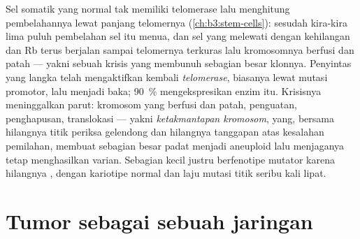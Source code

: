 \begin{definition}\label{def:b3:cancer-biology:telomerase}
Sel somatik yang normal tak memiliki telomerase lalu menghitung pembelahannya
lewat panjang telomernya (\cref{ch:b3:stem-cells}): sesudah kira-kira lima
puluh pembelahan sel itu menua, dan sel yang melewati  dengan
kehilangan  dan Rb terus berjalan sampai telomernya terkuras lalu
kromosomnya berfusi dan patah --- yakni sebuah krisis yang membunuh sebagian
besar klonnya. Penyintas yang langka telah mengaktifkan kembali
\emph{telomerase}, biasanya lewat mutasi promotor, lalu menjadi baka;
\qty{90}{\%}  mengekspresikan enzim itu. Krisisnya meninggalkan parut:
kromosom yang berfusi dan patah, penguatan, penghapusan, translokasi ---
yakni \emph{ketakmantapan kromosom}, yang, bersama hilangnya titik periksa
gelendong dan hilangnya tanggapan  atas kesalahan pemilahan, membuat
sebagian besar  padat menjadi aneuploid lalu menjaganya tetap
menghasilkan varian. Sebagian kecil  justru berfenotipe mutator karena
hilangnya , dengan kariotipe normal dan laju mutasi
titik seribu kali lipat.
\end{definition}

\section{Tumor sebagai sebuah jaringan}

